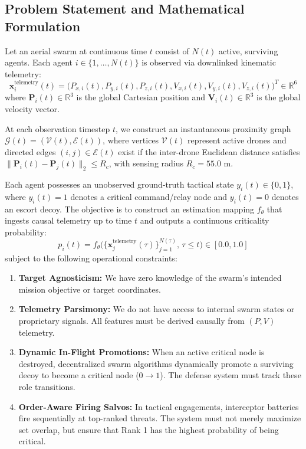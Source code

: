 \documentclass[9pt]{ieeeconf}
\newcommand{\RR}{\mathbb{R}}
\begin{document}
\subsection{Problem Statement and Mathematical Formulation}
Let an aerial swarm at continuous time $t$ consist of $N(t)$ active, surviving agents. Each agent $i \in \{1, \dots, N(t)\}$ is observed via downlinked kinematic telemetry:
\begin{equation}
\mathbf{x}_i^{\text{telemetry}}(t) = \big( P_{x,i}(t), P_{y,i}(t), P_{z,i}(t), V_{x,i}(t), V_{y,i}(t), V_{z,i}(t) \big)^T \in \RR^6
\end{equation}
where $\mathbf{P}_i(t) \in \RR^3$ is the global Cartesian position and $\mathbf{V}_i(t) \in \RR^3$ is the global velocity vector.

At each observation timestep $t$, we construct an instantaneous proximity graph $\mathcal{G}(t) = (\mathcal{V}(t), \mathcal{E}(t))$, where vertices $\mathcal{V}(t)$ represent active drones and directed edges $(i, j) \in \mathcal{E}(t)$ exist if the inter-drone Euclidean distance satisfies $\|\mathbf{P}_i(t) - \mathbf{P}_j(t)\|_2 \le R_c$, with sensing radius $R_c = 55.0\text{ m}$.

Each agent possesses an unobserved ground-truth tactical state $y_i(t) \in \{0, 1\}$, where $y_i(t) = 1$ denotes a critical command/relay node and $y_i(t) = 0$ denotes an escort decoy. The objective is to construct an estimation mapping $f_\theta$ that ingests causal telemetry up to time $t$ and outputs a continuous criticality probability:
\begin{equation}
p_i(t) = f_\theta \big( \{\mathbf{x}_j^{\text{telemetry}}(\tau)\}_{j=1}^{N(\tau)}, \, \tau \le t \big) \in [0.0, 1.0]
\end{equation}
subject to the following operational constraints:
\begin{enumerate}
    \item \textbf{Target Agnosticism:} We have zero knowledge of the swarm's intended mission objective or target coordinates.
    \item \textbf{Telemetry Parsimony:} We do not have access to internal swarm states or proprietary signals. All features must be derived causally from $(P, V)$ telemetry.
    \item \textbf{Dynamic In-Flight Promotions:} When an active critical node is destroyed, decentralized swarm algorithms dynamically promote a surviving decoy to become a critical node ($0 \to 1$). The defense system must track these role transitions.
    \item \textbf{Order-Aware Firing Salvos:} In tactical engagements, interceptor batteries fire sequentially at top-ranked threats. The system must not merely maximize set overlap, but ensure that Rank 1 has the highest probability of being critical.
\end{enumerate}
\end{document}
